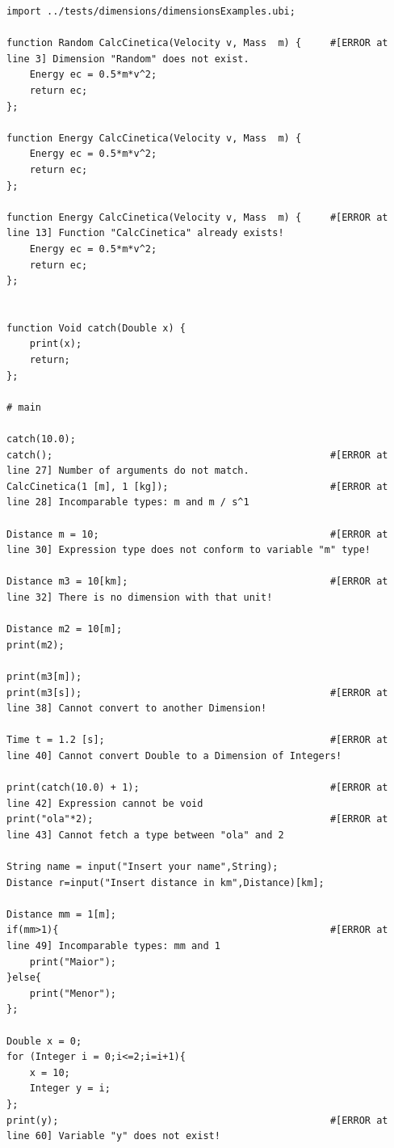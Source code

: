 \documentclass[10pt,portuguese]{article}
\begin{document}
\begin{lstlisting}
import ../tests/dimensions/dimensionsExamples.ubi;

function Random CalcCinetica(Velocity v, Mass  m) {     #[ERROR at line 3] Dimension "Random" does not exist.
    Energy ec = 0.5*m*v^2;
    return ec;
};

function Energy CalcCinetica(Velocity v, Mass  m) {
    Energy ec = 0.5*m*v^2;
    return ec;
};

function Energy CalcCinetica(Velocity v, Mass  m) {     #[ERROR at line 13] Function "CalcCinetica" already exists!
    Energy ec = 0.5*m*v^2;
    return ec;
};


function Void catch(Double x) {
    print(x);
    return;
};

# main

catch(10.0);
catch();                                                #[ERROR at line 27] Number of arguments do not match.
CalcCinetica(1 [m], 1 [kg]);                            #[ERROR at line 28] Incomparable types: m and m / s^1

Distance m = 10;                                        #[ERROR at line 30] Expression type does not conform to variable "m" type! 
       
Distance m3 = 10[km];                                   #[ERROR at line 32] There is no dimension with that unit!

Distance m2 = 10[m];
print(m2);

print(m3[m]);                                               
print(m3[s]);                                           #[ERROR at line 38] Cannot convert to another Dimension!

Time t = 1.2 [s];                                       #[ERROR at line 40] Cannot convert Double to a Dimension of Integers!

print(catch(10.0) + 1);                                 #[ERROR at line 42] Expression cannot be void
print("ola"*2);                                         #[ERROR at line 43] Cannot fetch a type between "ola" and 2

String name = input("Insert your name",String);
Distance r=input("Insert distance in km",Distance)[km];

Distance mm = 1[m];
if(mm>1){                                               #[ERROR at line 49] Incomparable types: mm and 1
    print("Maior");
}else{
    print("Menor");
};

Double x = 0;
for (Integer i = 0;i<=2;i=i+1){
    x = 10;
    Integer y = i;
};
print(y);                                               #[ERROR at line 60] Variable "y" does not exist!



\end{lstlisting}
\end{document}
